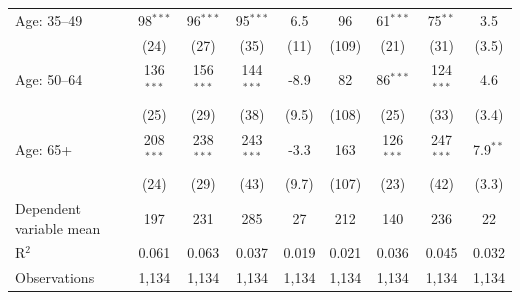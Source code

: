 \begin{table}
{\begin{tabular}[t]{lcccccccc}
Age: 35--49 & 98$^{***}$ & 96$^{***}$ & 95$^{***}$ & 6.5 & 96 & 61$^{***}$ & 75$^{**}$ & 3.5\\
 & (24) & (27) & (35) & (11) & (109) & (21) & (31) & (3.5)\\
Age: 50--64 & 136$^{***}$ & 156$^{***}$ & 144$^{***}$ & -8.9 & 82 & 86$^{***}$ & 124$^{***}$ & 4.6\\
 & (25) & (29) & (38) & (9.5) & (108) & (25) & (33) & (3.4)\\
Age: 65+ & 208$^{***}$ & 238$^{***}$ & 243$^{***}$ & -3.3 & 163 & 126$^{***}$ & 247$^{***}$ & 7.9$^{**}$\\
 & (24) & (29) & (43) & (9.7) & (107) & (23) & (42) & (3.3)\\
Dependent variable mean & 197 & 231 & 285 & 27 & 212 & 140 & 236 & 22\\
R$^2$ & 0.061 & 0.063 & 0.037 & 0.019 & 0.021 & 0.036 & 0.045 & 0.032\\
Observations & 1,134 & 1,134 & 1,134 & 1,134 & 1,134 & 1,134 & 1,134 & 1,134\\
\bottomrule
\end{tabular}}
\end{table}